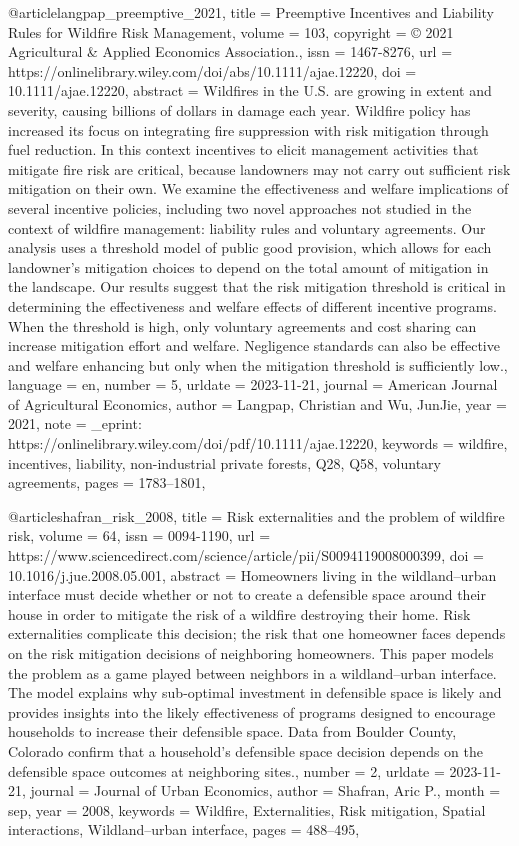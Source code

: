 {{{@article{langpap_preemptive_2021,
	title = {Preemptive {Incentives} and {Liability} {Rules} for {Wildfire} {Risk} {Management}},
	volume = {103},
	copyright = {© 2021 Agricultural \& Applied Economics Association.},
	issn = {1467-8276},
	url = {https://onlinelibrary.wiley.com/doi/abs/10.1111/ajae.12220},
	doi = {10.1111/ajae.12220},
	abstract = {Wildfires in the U.S. are growing in extent and severity, causing billions of dollars in damage each year. Wildfire policy has increased its focus on integrating fire suppression with risk mitigation through fuel reduction. In this context incentives to elicit management activities that mitigate fire risk are critical, because landowners may not carry out sufficient risk mitigation on their own. We examine the effectiveness and welfare implications of several incentive policies, including two novel approaches not studied in the context of wildfire management: liability rules and voluntary agreements. Our analysis uses a threshold model of public good provision, which allows for each landowner's mitigation choices to depend on the total amount of mitigation in the landscape. Our results suggest that the risk mitigation threshold is critical in determining the effectiveness and welfare effects of different incentive programs. When the threshold is high, only voluntary agreements and cost sharing can increase mitigation effort and welfare. Negligence standards can also be effective and welfare enhancing but only when the mitigation threshold is sufficiently low.},
	language = {en},
	number = {5},
	urldate = {2023-11-21},
	journal = {American Journal of Agricultural Economics},
	author = {Langpap, Christian and Wu, JunJie},
	year = {2021},
	note = {\_eprint: https://onlinelibrary.wiley.com/doi/pdf/10.1111/ajae.12220},
	keywords = {wildfire, incentives, liability, non-industrial private forests, Q28, Q58, voluntary agreements},
	pages = {1783--1801},
}

@article{shafran_risk_2008,
	title = {Risk externalities and the problem of wildfire risk},
	volume = {64},
	issn = {0094-1190},
	url = {https://www.sciencedirect.com/science/article/pii/S0094119008000399},
	doi = {10.1016/j.jue.2008.05.001},
	abstract = {Homeowners living in the wildland–urban interface must decide whether or not to create a defensible space around their house in order to mitigate the risk of a wildfire destroying their home. Risk externalities complicate this decision; the risk that one homeowner faces depends on the risk mitigation decisions of neighboring homeowners. This paper models the problem as a game played between neighbors in a wildland–urban interface. The model explains why sub-optimal investment in defensible space is likely and provides insights into the likely effectiveness of programs designed to encourage households to increase their defensible space. Data from Boulder County, Colorado confirm that a household's defensible space decision depends on the defensible space outcomes at neighboring sites.},
	number = {2},
	urldate = {2023-11-21},
	journal = {Journal of Urban Economics},
	author = {Shafran, Aric P.},
	month = sep,
	year = {2008},
	keywords = {Wildfire, Externalities, Risk mitigation, Spatial interactions, Wildland–urban interface},
	pages = {488--495},
}

}}}

